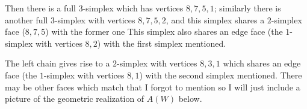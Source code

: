 \documentclass[11pt]{article}
\begin{document}
\begin{enumerate}
\begin{enumerate}
        Then there is a full $3$-simplex which has vertices $8,7,5,1$; similarly there is another full $3$-simplex with vertices $8,7,5,2$, and this simplex shares a $2$-simplex face ($8,7,5$) with the former one This simplex also shares an edge face (the $1$-simplex with vertices $8,2$) with the first simplex mentioned.

        The left chain gives rise to a $2$-simplex with vertices $8,3,1$ which shares an edge face (the $1$-simplex with vertices $8,1$) with the second simplex mentioned. There may be other faces which match that I forgot to mention so I will just include a picture of the geometric realization of $A(W)$ below.
    \end{enumerate}
\end{enumerate}
\end{document}
